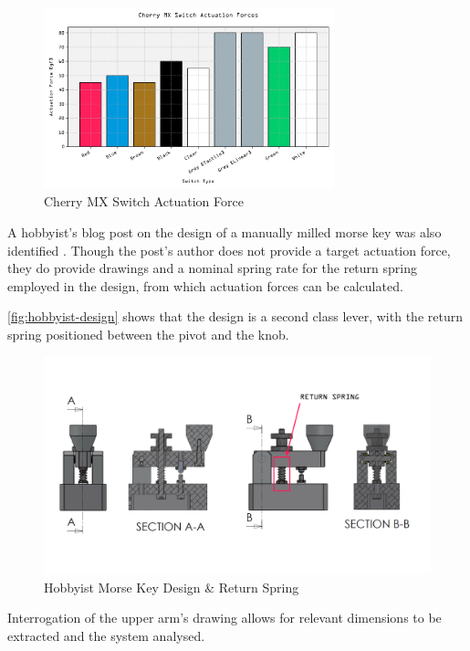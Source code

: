 \documentclass[10pt]{article}
\begin{document}
\begin{figure}[H]
	\centering
	\includegraphics[width=0.75\textwidth]{./assets/01-cherry-mx-switches.png}
	\caption{Cherry MX Switch Actuation Force \cite{keychron2025, cherry2025}} %
	\label{fig:cherry-mx-switches}
\end{figure}

A hobbyist's blog post on the design of a manually milled morse key was also identified
\cite{giangrandi2025}. Though the post's author does not provide a target actuation force, they do
provide drawings and a nominal spring rate for the return spring employed in the design, from which
actuation forces can be calculated.

\autoref{fig:hobbyist-design} shows that the design is a second class lever, with the return
spring positioned between the pivot and the knob.

\begin{figure}[H]
	\centering
	\includegraphics[width=\textwidth]{./assets/02-hobbyist-design.png}
	\caption{Hobbyist Morse Key Design \& Return Spring \cite{giangrandi2025}}
	\label{fig:hobbyist-design}
\end{figure}

Interrogation of the upper arm's drawing allows for relevant dimensions to be extracted and the
system analysed.
\end{document}
